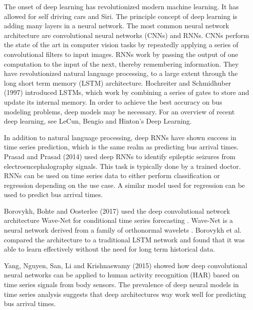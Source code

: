 The onset of deep learning has revolutionized modern machine learning.
It has allowed for self driving cars and Siri.
The principle concept of deep learning is adding many layers in a neural network.
The most common neural network architecture are convolutional neural networks (CNNs) and RNNs.
CNNs perform the state of the art in computer vision tasks by repeatedly applying a series of convolutional filters to input images.
RNNs work by passing the output of one computation to the input of the next, thereby remembering information.
They have revolutionized natural language processing, to a large extent through the long short term memory (LSTM) architecture.
Hochreiter and Schmidhuber (1997) introduced LSTMs, which work by combining a series of gates to store and update its internal memory\cite{hochreiter1997long}.
In order to achieve the best accuracy on bus modeling problems, deep models may be necessary.
For an overview of recent deep learning, see LeCun, Bengio and Hinton's Deep Learning\cite{lecun2015deep}.

In addition to natural language processing, deep RNNs have shown success in time series prediction, which is the same realm as predicting bus arrival times.
Prasad and Prasad (2014) used deep RNNs to identify epileptic seizures from electroencephalography signals\cite{prasad2014deep}.
This task is typically done by a trained doctor.
RNNs can be used on time series data to either perform classification or regression depending on the use case.
A similar model used for regression can be used to predict bus arrival times.

Borovykh, Bohte and Oosterlee (2017) used the deep convolutional network architecture Wave-Net for conditional time series forecasting \cite{borovykh2017conditional}.
Wave-Net is a neural network derived from a family of orthonormal wavelets \cite{bakshi1993wave}.
Borovykh et al. compared the architecture to a traditional LSTM network and found that it was able to learn effectively without the need for long term historical data.


Yang, Nguyen, San, Li and Krishnaswamy (2015) showed how deep convolutional neural networks can be applied to human activity recognition (HAR) based on time series signals from body sensors\cite{yang2015deep}.
The prevalence of deep neural models in time series analysis suggests that deep architectures way work well for predicting bus arrival times.

